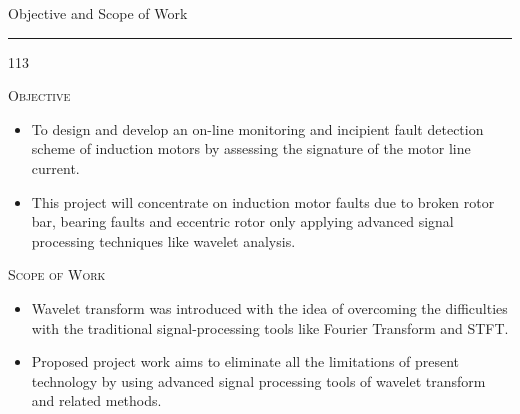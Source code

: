 \documentclass[a4,portrait,slidesonly]{seminar}
\begin{document}
\begin{slide*}
{\large \textsf{Objective and Scope of Work}}\\
\hrule
\vspace{10pt}
\begin{dinglist} {113}
\item \textsc{Objective}
    \begin{itemize}
    \item To design and develop an on-line monitoring and incipient fault detection scheme of induction motors by assessing the signature of the motor line current.
    \item This  project  will concentrate on induction motor faults due to broken rotor bar, bearing faults and eccentric rotor only applying  advanced  signal processing techniques like wavelet analysis.
    \end{itemize}
\item \textsc{Scope of Work}
    \begin{itemize}
    \item Wavelet transform was introduced with the idea of overcoming the difficulties with the traditional signal-processing tools like Fourier Transform and STFT.
    \item Proposed project work aims to eliminate all the limitations of present technology by using advanced signal processing tools of wavelet transform and related methods.
    \end{itemize}
\end{dinglist}
\end{slide*}
\end{document}

